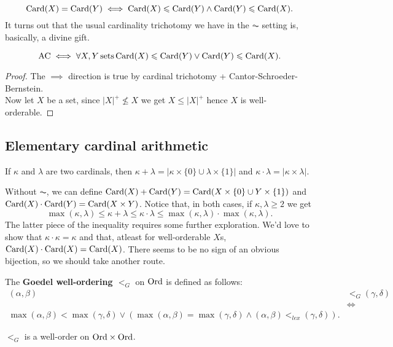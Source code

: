\documentclass[twoside,openright,titlepage,numbers=noenddot,%
               headinclude,footinclude,cleardoublepage=empty,abstract=on,
               BCOR=23mm,paper=letter,fontsize=11pt
               ]{scrreprt}
\begin{document}
\[ \mathrm{Card}(X) = \mathrm{Card}(Y) \iff \mathrm{Card}(X) \leqslant \mathrm{Card}(Y) \land \mathrm{Card}(Y) \leqslant \mathrm{Card}(X). \]
It turns out that the usual cardinality trichotomy we have in the $\AC$ setting is, basically, a divine gift.
\begin{theorem}
    \[ \mathrm{AC} \iff \forall X,Y \, \text{sets} \, \mathrm{Card}(X) \leqslant \mathrm{Card}(Y) \lor \mathrm{Card}(Y) \leqslant \mathrm{Card}(X). \]
\end{theorem}
\begin{proof}
    The $\implies$ direction is true by cardinal trichotomy + Cantor-Schroeder-Bernstein. \\
    Now let $X$ be a set, since $\vert X \vert^+ \not\leq X$ we get $X \leq \vert X \vert^+$ hence $X$ is well-orderable.
\end{proof}
\subsection{Elementary cardinal arithmetic}
\begin{definition}[$\AC$]
    If $\kappa$ and $\lambda$ are two cardinals, then $\kappa + \lambda = \vert \kappa \times \{0\} \cup \lambda \times \{1\}\vert$ and $\kappa \cdot \lambda = \vert \kappa \times \lambda\vert$.   
\end{definition}
Without $\AC$, we can define $\mathrm{Card}(X) + \mathrm{Card}(Y) = \mathrm{Card}(X \times \{0\} \cup Y \times \{1\})$ and $\mathrm{Card}(X) \cdot \mathrm{Card}(Y) = \mathrm{Card}(X \times Y)$. Notice that, in both cases, if $\kappa, \lambda \geq 2$ we get
\[ \max(\kappa, \lambda) \leq \kappa + \lambda \leq  \kappa \cdot \lambda \leq \max(\kappa,\lambda) \cdot \max(\kappa,\lambda). \]
The latter piece of the inequality requires some further exploration. We'd love to show that $\kappa \cdot \kappa = \kappa$ and that, atleast for well-orderable $X$s, $\mathrm{Card}(X) \cdot \mathrm{Card}(X) = \mathrm{Card}(X)$. There seems to be no sign of an obvious bijection, so we should take another route.
\begin{definition}
    The \textbf{Goedel well-ordering $<_G$} on $\mathrm{Ord}$ is defined as follows:
    \begin{align*}
        (\alpha, \beta) &<_G (\gamma, \delta) \\
        &\iff \\
        \max(\alpha,\beta) < \max(\gamma,\delta) \lor (\max(\alpha,\beta) = \max(\gamma,\delta) \land (\alpha,\beta) <_{lex} (\gamma,\delta)).
    \end{align*}
\end{definition}
\begin{proposition}
    $<_G$ is a well-order on $\mathrm{Ord} \times \mathrm{Ord}$.
\end{proposition}
\end{document}
